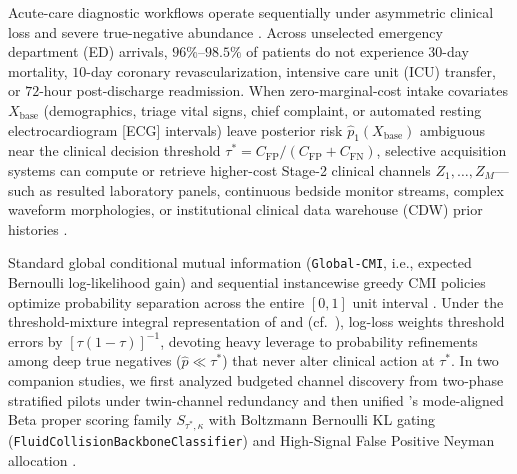 \documentclass[11pt]{article}
\theoremstyle{remark}
\begin{document}
Acute-care diagnostic workflows operate sequentially under asymmetric clinical loss and severe true-negative abundance \citep{turney1995cost,vickers2006decision,mullainathan2022diagnosing,kansal2025mcmed}. Across unselected emergency department (ED) arrivals, $96\%\text{--}98.5\%$ of patients do not experience $30$-day mortality, $10$-day coronary revascularization, intensive care unit (ICU) transfer, or $72$-hour post-discharge readmission. When zero-marginal-cost intake covariates $X_{\text{base}}$ (demographics, triage vital signs, chief complaint, or automated resting electrocardiogram [ECG] intervals) leave posterior risk $\hat{p}_1(X_{\text{base}})$ ambiguous near the clinical decision threshold $\tau^* = C_{\text{FP}} / (C_{\text{FP}} + C_{\text{FN}})$, selective acquisition systems can compute or retrieve higher-cost Stage-2 clinical channels $Z_1, \dots, Z_M$---such as resulted laboratory panels, continuous bedside monitor streams, complex waveform morphologies, or institutional clinical data warehouse (CDW) prior histories \citep{saartsechansky2009active,bilgic2011value,covert2023learning,vonkleist2025evaluation}.

Standard global conditional mutual information (\texttt{Global-CMI}, i.e., expected Bernoulli log-likelihood gain) and sequential instancewise greedy CMI policies \citep{covert2023learning} optimize probability separation across the entire $[0,1]$ unit interval \citep{gneiting2007strictly,saito2015precision}. Under the threshold-mixture integral representation of \citet{schervish1989general} and \citet{buja2005loss} (cf.\ \citealp{ehm2016quantiles}), log-loss weights threshold errors by $[\tau(1-\tau)]^{-1}$, devoting heavy leverage to probability refinements among deep true negatives ($\hat{p} \ll \tau^*$) that never alter clinical action at $\tau^*$. In two companion studies, we first analyzed budgeted channel discovery from two-phase stratified pilots under twin-channel redundancy \citep{satz2026pilot} and then unified \citeauthor{buja2005loss}'s mode-aligned Beta proper scoring family $S_{\tau^*,\kappa}$ with Boltzmann Bernoulli KL gating (\texttt{FluidCollisionBackboneClassifier}) and High-Signal False Positive Neyman allocation \citep{satz2026collision}.
\end{document}
